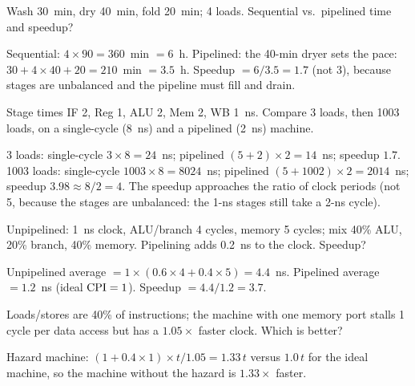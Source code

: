 \documentclass[11pt]{article}
\begin{document}
\begin{exercise}[Laundry]
Wash 30~min, dry 40~min, fold 20~min; 4 loads. Sequential vs.\ pipelined
time and speedup?
\end{exercise}
\begin{solution}
Sequential: $4\times90 = 360$~min $=6$~h. Pipelined: the 40-min dryer sets
the pace: $30 + 4\times40 + 20 = 210$~min $=3.5$~h. Speedup $=6/3.5 =
1.7$ (not 3), because stages are unbalanced and the pipeline must fill and
drain.
\end{solution}

\begin{exercise}
Stage times IF 2, Reg 1, ALU 2, Mem 2, WB 1~ns. Compare 3 loads, then 1003
loads, on a single-cycle (8~ns) and a pipelined (2~ns) machine.
\end{exercise}
\begin{solution}
3 loads: single-cycle $3\times8 = 24$~ns; pipelined $(5+2)\times2 = 14$~ns;
speedup $1.7$.
1003 loads: single-cycle $1003\times8 = 8024$~ns; pipelined
$(5+1002)\times2 = 2014$~ns; speedup $3.98 \approx 8/2 = 4$. The speedup
approaches the ratio of clock periods (not 5, because the stages are
unbalanced: the 1-ns stages still take a 2-ns cycle).
\end{solution}

\begin{exercise}
Unpipelined: 1~ns clock, ALU/branch 4 cycles, memory 5 cycles; mix 40\%
ALU, 20\% branch, 40\% memory. Pipelining adds 0.2~ns to the clock.
Speedup?
\end{exercise}
\begin{solution}
Unpipelined average $=1\times(0.6\times4 + 0.4\times5) = 4.4$~ns.
Pipelined average $= 1.2$~ns (ideal $\mathrm{CPI}=1$). Speedup $=4.4/1.2 = 3.7$.
\end{solution}

\begin{exercise}
Loads/stores are 40\% of instructions; the machine with one memory port
stalls 1 cycle per data access but has a $1.05\times$ faster clock. Which is
better?
\end{exercise}
\begin{solution}
Hazard machine: $(1+0.4\times1)\times t/1.05 = 1.33\,t$ versus $1.0\,t$ for
the ideal machine, so the machine without the hazard is $1.33\times$
faster.
\end{solution}
\end{document}
